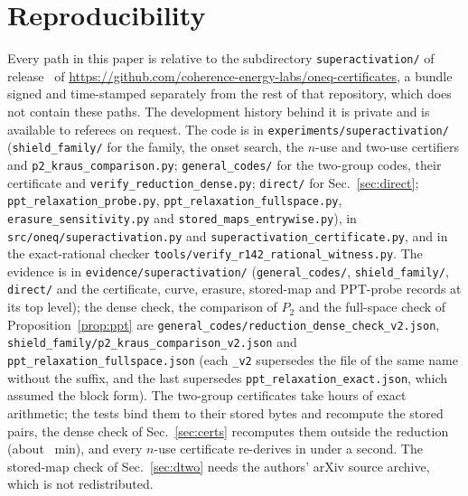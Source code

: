 \documentclass[aps,pra,twocolumn,superscriptaddress,nofootinbib,longbibliography,floatfix]{revtex4-2}
\begin{document}
\section{Reproducibility}
\label{sec:repro}

{\raggedright Every path in this paper is relative to the subdirectory \texttt{superactivation/} of release \LaneRelease\ of \url{https://github.com/coherence-energy-labs/oneq-certificates}, a bundle signed and time-stamped separately from the rest of that repository, which does not contain these paths. The development history behind it is private and is available to referees on request. The code is in \texttt{experiments/\allowbreak superactivation/} (\texttt{shield\_family/} for the family, the onset search, the $n$-use and two-use certifiers and \texttt{p2\_kraus\_comparison.py}; \texttt{general\_codes/} for the two-group codes, their certificate and \texttt{verify\_reduction\_dense.py}; \texttt{direct/} for Sec.~\ref{sec:direct}; \texttt{ppt\_relaxation\_probe.py}, \texttt{ppt\_relaxation\_fullspace.py}, \texttt{erasure\_sensitivity.py} and \texttt{stored\_maps\_entrywise.py}), in \texttt{src/\allowbreak oneq/\allowbreak superactivation.py} and \texttt{superactivation\_certificate.py}, and in the exact-rational checker \texttt{tools/\allowbreak verify\_r142\_rational\_witness.py}. The evidence is in \texttt{evidence/\allowbreak superactivation/} (\texttt{general\_codes/}, \texttt{shield\_family/}, \texttt{direct/} and the certificate, curve, erasure, stored-map and PPT-probe records at its top level); the dense check, the comparison of $P_2$ and the full-space check of Proposition~\ref{prop:ppt} are \texttt{general\_codes/\allowbreak reduction\_dense\_check\_v2.json}, \texttt{shield\_family/\allowbreak p2\_kraus\_comparison\_v2.json} and \texttt{ppt\_relaxation\_fullspace.json} (each \texttt{\_v2} supersedes the file of the same name without the suffix, and the last supersedes \texttt{ppt\_relaxation\_exact.json}, which assumed the block form). The two-group certificates take hours of exact arithmetic; the tests bind them to their stored bytes and recompute the stored pairs, the dense check of Sec.~\ref{sec:certs} recomputes them outside the reduction (about \RedMinutes~min), and every $n$-use certificate re-derives in under a second. The stored-map check of Sec.~\ref{sec:dtwo} needs the authors' arXiv source archive, which is not redistributed.\par}
\end{document}
